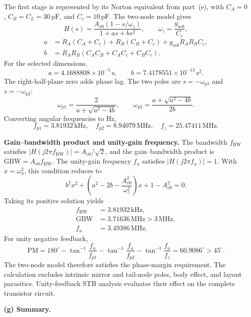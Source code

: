 \documentclass[12pt,letterpaper]{article}
\newcommand{\MHz}{\,\mathrm{MHz}}
\newcommand{\kHz}{\,\mathrm{kHz}}
\newcommand{\pF}{\,\mathrm{pF}}
\begin{document}
\begin{enumerate}
The first stage is represented by its Norton equivalent from part~(e), with
$C_A=0$, $C_B=C_L=30\pF$, and $C_c=10\pF$.
The two-node model gives
\[
H(s)=\frac{A_{v0}(1-s/\omega_z)}{1+a s+b s^2},
\qquad \omega_z=\frac{g_{m8}}{C_c},
\]
\begin{align*}
a&=R_A(C_A+C_c)+R_B(C_B+C_c)+g_{m8}R_AR_BC_c,\\
b&=R_AR_B(C_AC_B+C_AC_c+C_BC_c).
\end{align*}
For the selected dimensions,
\[
a=4.1688808\times10^{-5}\,\mathrm{s},\qquad
b=7.4178551\times10^{-13}\,\mathrm{s}^2.
\]
The right-half-plane zero adds phase lag.
The two poles are $s=-\omega_{p1}$ and $s=-\omega_{p2}$:
\[
\omega_{p1}=\frac{2}{a+\sqrt{a^2-4b}},\qquad
\omega_{p2}=\frac{a+\sqrt{a^2-4b}}{2b}.
\]
Converting angular frequencies to Hz,
\[
\boxed{f_{p1}=3.81932\kHz,\quad
f_{p2}=8.94079\MHz,\quad f_z=25.47411\MHz.}
\]

\textbf{Gain--bandwidth product and unity-gain frequency.}
The bandwidth $f_{\mathrm{BW}}$ satisfies
$|H(j2\pi f_{\mathrm{BW}})|=A_{v0}/\sqrt2$, and the gain--bandwidth
product is $\mathrm{GBW}=A_{v0}f_{\mathrm{BW}}$.
The unity-gain frequency $f_u$ satisfies $|H(j2\pi f_u)|=1$.
With $x=\omega_u^2$, this condition reduces to
\[
b^2x^2+
\left(a^2-2b-\frac{A_{v0}^2}{\omega_z^2}\right)x+
1-A_{v0}^2=0.
\]
Taking its positive solution yields
\begin{align*}
f_{\mathrm{BW}}&=3.81932\kHz,\\
\mathrm{GBW}&=\boxed{3.71636\MHz>3\MHz},\\
f_u&=\boxed{3.49386\MHz}.
\end{align*}
For unity negative feedback,
\[
\mathrm{PM}=180^\circ-
\tan^{-1}\frac{f_u}{f_{p1}}-
\tan^{-1}\frac{f_u}{f_{p2}}-
\tan^{-1}\frac{f_u}{f_z}
=\boxed{60.9086^\circ>45^\circ}.
\]
The two-node model therefore satisfies the phase-margin requirement.
The calculation excludes intrinsic mirror and tail-node poles,
body effect, and layout parasitics. Unity-feedback STB analysis
evaluates their effect on the complete transistor circuit.

\newpage
\textbf{(g) Summary.}


\end{enumerate}
\end{document}
